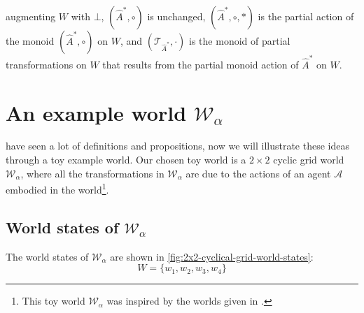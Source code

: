  augmenting $W$ with $\bot$, $(\hat{A}^{*}, \circ)$ is unchanged, $(\hat{A}^{*}, \circ, \ast)$ is the partial action of the monoid $(\hat{A}^{*}, \circ)$ on $W$, and $(\mathcal{T}_{\hat{A}^{*}}, \cdot)$ is the monoid of partial transformations on $W$ that results from the partial monoid action of $\hat{A}^{*}$ on $W$.


\section{
An example world \texorpdfstring{$\mathscr{W}_{\alpha}$}{}
 }\label{sec:an_example_world}

 have seen a lot of definitions and propositions, now we will illustrate these ideas through a toy example world.
Our chosen toy world is a $2\times 2$ cyclic grid world $\mathscr{W}_{\alpha}$, where all the transformations in $\mathscr{W}_{\alpha}$ are due to the actions of an agent $\mathscr{A}$ embodied in the world\footnote{
This toy world $\mathscr{W}_{\alpha}$ was inspired by the worlds given in \cite{Higgins2018,caselles2019symmetry}.
}.


\subsection{
World states of $\mathscr{W}_{\alpha}$
}\label{sec:World states of example}

The world states of $\mathscr{W}_{\alpha}$ are shown in \cref{fig:2x2-cyclical-grid-world-states}:
\begin{equation}
    W = \{ w_{1}, w_{2}, w_{3}, w_{4} \}
\end{equation}

